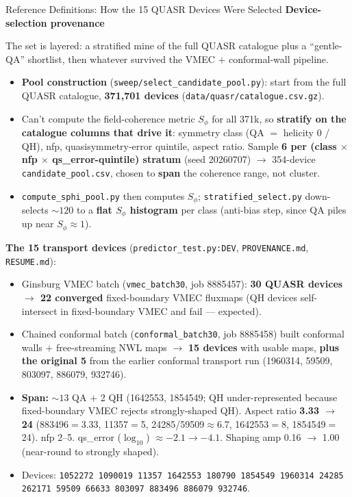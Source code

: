 \documentclass[11pt,aspectratio=169]{beamer}
\newcommand{\qitem}[1]{\medskip\textbf{#1}\par}
\begin{document}
\begin{frame}[allowframebreaks]{Reference Definitions: How the 15 QUASR Devices Were Selected}
\small
\qitem{Device-selection provenance}
The set is layered: a stratified mine of the full QUASR catalogue plus a ``gentle-QA''
shortlist, then whatever survived the VMEC $+$ conformal-wall pipeline.
\begin{itemize}
\item \textbf{Pool construction} (\texttt{sweep/select\_candidate\_pool.py}): start from the
      full QUASR catalogue, \textbf{371{,}701 devices} (\texttt{data/quasr/catalogue.csv.gz}).
\item Can't compute the field-coherence metric $S_\phi$ for all 371k, so \textbf{stratify on
      the catalogue columns that drive it}: symmetry class (QA $=$ helicity 0 / QH), nfp,
      quasisymmetry-error quintile, aspect ratio. Sample \textbf{6 per (class $\times$ nfp
      $\times$ qs\_error-quintile) stratum} (seed 20260707) $\to$ 354-device
      \texttt{candidate\_pool.csv}, chosen to \textbf{span} the coherence range, not cluster.
\item \texttt{compute\_sphi\_pool.py} then computes $S_\phi$; \texttt{stratified\_select.py}
      down-selects $\sim 120$ to a \textbf{flat $S_\phi$ histogram} per class (anti-bias step,
      since QA piles up near $S_\phi \approx 1$).
\end{itemize}

\framebreak
\textbf{The 15 transport devices} (\texttt{predictor\_test.py:DEV}, \texttt{PROVENANCE.md},
\texttt{RESUME.md}):
\begin{itemize}
\item Ginsburg VMEC batch (\texttt{vmec\_batch30}, job 8885457): \textbf{30 QUASR devices $\to$
      22 converged} fixed-boundary VMEC fluxmaps (QH devices self-intersect in fixed-boundary
      VMEC and fail --- expected).
\item Chained conformal batch (\texttt{conformal\_batch30}, job 8885458) built conformal walls
      $+$ free-streaming NWL maps $\to$ \textbf{15 devices} with usable maps, \textbf{plus the
      original 5} from the earlier conformal transport run (1960314, 59509, 803097, 886079,
      932746).
\item \textbf{Span:} $\sim 13$ QA $+$ 2 QH (1642553, 1854549; QH under-represented because
      fixed-boundary VMEC rejects strongly-shaped QH). Aspect ratio \textbf{3.33 $\to$ 24}
      (883496$=$3.33, 11357$=$5, 24285/59509$\approx$6.7, 1642553$=$8, 1854549$=$24). nfp
      2--5. qs\_error ($\log_{10}$) $\approx -2.1 \to -4.1$. Shaping amp 0.16 $\to$ 1.00
      (near-round to strongly shaped).
\item Devices: \texttt{1052272 1090019 11357 1642553 180790 1854549 1960314 24285 262171
      59509 66633 803097 883496 886079 932746}.
\end{itemize}
\end{frame}
\end{document}
